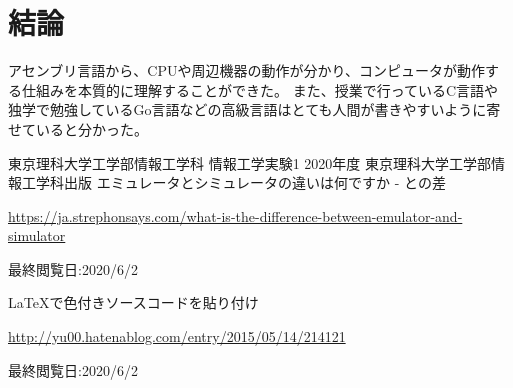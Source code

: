 \documentclass[12pt]{jarticle}
\begin{document}
\section{結論}

アセンブリ言語から、CPUや周辺機器の動作が分かり、コンピュータが動作する仕組みを本質的に理解することができた。
また、授業で行っているC言語や独学で勉強しているGo言語などの高級言語はとても人間が書きやすいように寄せていると分かった。

\begin{thebibliography}{99}
	\label{sannkoubunnkenn_chapter}
	東京理科大学工学部情報工学科 情報工学実験1 2020年度
	東京理科大学工学部情報工学科出版
	エミュレータとシミュレータの違いは何ですか - との差

	\url{https://ja.strephonsays.com/what-is-the-difference-between-emulator-and-simulator}

	最終閲覧日:2020/6/2

	\bibitem[3]{}LaTeXで色付きソースコードを貼り付け

	\url{http://yu00.hatenablog.com/entry/2015/05/14/214121}

	最終閲覧日:2020/6/2

\end{thebibliography}

\clearpage
\appendix
\end{document}
